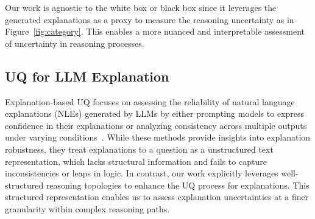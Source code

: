 Our work is agnostic to the white box or black box since it leverages the generated explanations as a proxy to measure the reasoning uncertainty as in Figure~\ref{fig:category}. This enables a more nuanced and interpretable assessment of uncertainty in reasoning processes.


\subsection{UQ for LLM Explanation} 
Explanation-based UQ focuses on assessing the reliability of natural language explanations (NLEs) generated by LLMs by either prompting models to express confidence in their explanations or analyzing consistency across multiple outputs under varying conditions~\cite{tanneru2024quantifying, yadkori2024believe}. While these methods provide insights into explanation robustness, they treat explanations to a question as a unstructured text representation, which lacks structural information and fails to capture inconsistencies or leaps in logic. In contrast, our work explicitly leverages well-structured reasoning topologies to enhance the UQ process for explanations. This structured representation enables us to assess explanation uncertainties at a finer granularity within complex reasoning paths.